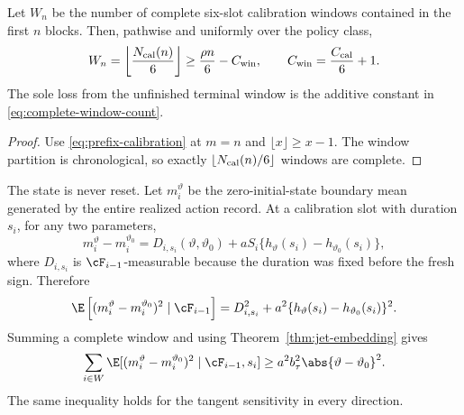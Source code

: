 \begin{lemma}
\label{lem:prefix-window-count}
Let \(W_n\) be the number of complete six-slot calibration windows contained
in the first \(n\) blocks.  Then, pathwise and uniformly over the policy
class,
\begin{equation}
 W_n=\left\lfloor\frac{N_{\rm cal}(n)}6\right\rfloor
 \ge \frac{\rho n}{6}-C_{\rm win},
 \qquad C_{\rm win}=\frac{C_{\rm cal}}6+1.
 \label{eq:complete-window-count}
\end{equation}
The sole loss from the unfinished terminal window is the additive constant in
\eqref{eq:complete-window-count}.
\end{lemma}

\begin{proof}
Use \eqref{eq:prefix-calibration} at \(m=n\) and
\(\lfloor x\rfloor\ge x-1\).  The window partition is chronological, so
exactly \(\lfloor N_{\rm cal}(n)/6\rfloor\) windows are complete.
\end{proof}

The state is never reset.  Let \(m_i^\vartheta\) be the zero-initial-state
boundary mean generated by the entire realized action record.  At a
calibration slot with duration \(s_i\), for any two parameters,
\begin{equation}
 m_i^\vartheta-m_i^{\vartheta_0}
 =D_{i,s_i}(\vartheta,\vartheta_0)
  +aS_i\{h_\vartheta(s_i)-h_{\vartheta_0}(s_i)\},
 \label{eq:sign-decomposition}
\end{equation}
where \(D_{i,s_i}\) is \(\cF_{i-1}\)-measurable because the duration
was fixed before the fresh sign.  Therefore
\begin{equation}
 \E\left[(m_i^\vartheta-m_i^{\vartheta_0})^2
 \mid\cF_{i-1}\right]
 =D_{i,s_i}^2+a^2\{h_\vartheta(s_i)-h_{\vartheta_0}(s_i)\}^2.
 \label{eq:sign-square}
\end{equation}
Summing a complete window and using Theorem~\ref{thm:jet-embedding} gives
\begin{equation}
 \sum_{i\in W}\E[(m_i^\vartheta-m_i^{\vartheta_0})^2
 \mid\cF_{i-1},s_i]
 \ge a^2b_\tau^2\abs{\vartheta-\vartheta_0}^2.
 \label{eq:window-contrast}
\end{equation}
The same inequality holds for the tangent sensitivity in every direction.

